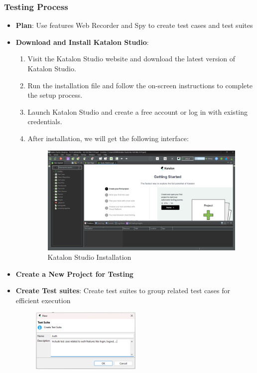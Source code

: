 \subsubsection{Testing Process}
\begin{itemize}
  \item \textbf{Plan}: Use features Web Recorder and Spy to create test cases and test suites
  \item \textbf{Download and Install Katalon Studio}: 
  \begin{enumerate}
    \item Visit the Katalon Studio website and download the latest version of Katalon Studio.
    \item Run the installation file and follow the on-screen instructions to complete the setup process.
    \item Launch Katalon Studio and create a free account or log in with existing credentials.
    \item After installation, we will get the following interface: \begin{figure}[H]
      \centering
      \includegraphics[width=15cm]{graphics/chapter6/katalon_installation.png}
      \caption{Katalon Studio Installation}
      \label{fig:katalon_installation}
    \end{figure}
  \end{enumerate}
  \item \textbf{Create a New Project for Testing}
  \item \textbf{Create Test suites}: Create test suites to group related test cases for efficient execution
  \begin{figure}[H]
    \centering
    \includegraphics[width=0.5\textwidth]{graphics/chapter6/new_test_suite.png}

\end{figure}
\end{itemize}
